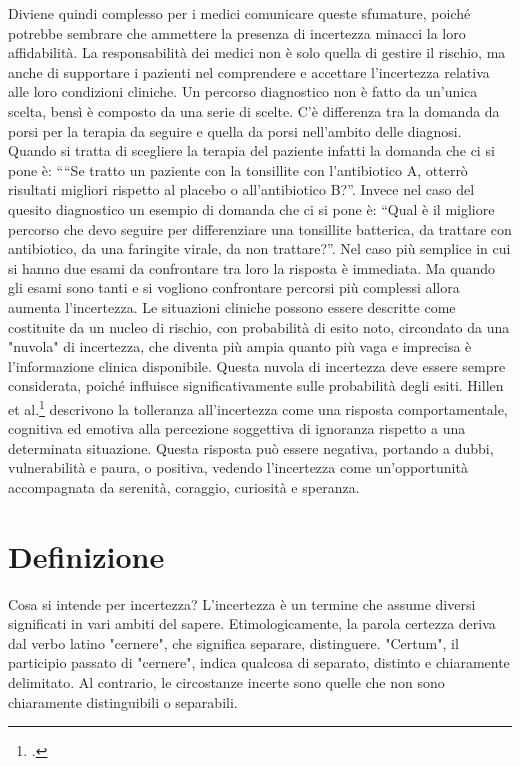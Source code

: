 Diviene quindi complesso per i medici comunicare queste sfumature, poiché potrebbe sembrare che ammettere la presenza di incertezza minacci la loro affidabilità. La responsabilità dei medici non è solo quella di gestire il rischio, ma anche di supportare i pazienti nel comprendere e accettare l'incertezza relativa alle loro condizioni cliniche. 
Un percorso diagnostico non è fatto da un'unica scelta, bensì è composto da una serie di scelte. C'è differenza tra la domanda da porsi per la terapia da seguire e quella da porsi nell'ambito delle diagnosi. Quando si tratta di scegliere la terapia del paziente infatti la domanda che ci si pone è: ““Se tratto un paziente con la tonsillite con l'antibiotico A, otterrò risultati migliori rispetto al placebo o all'antibiotico B?”. Invece nel caso del quesito diagnostico un esempio di domanda che ci si pone è:  “Qual è il migliore percorso che devo seguire per differenziare una tonsillite batterica, da trattare con antibiotico, da una faringite virale, da non trattare?”.
Nel caso più semplice in cui si hanno due esami da confrontare tra loro la risposta è immediata. Ma quando gli esami sono tanti e si vogliono confrontare percorsi più complessi allora aumenta l'incertezza. 
Le situazioni cliniche possono essere descritte come costituite da un nucleo di rischio, con probabilità di esito noto, circondato da una "nuvola" di incertezza, che diventa più ampia quanto più vaga e imprecisa è l'informazione clinica disponibile. Questa nuvola di incertezza deve essere sempre considerata, poiché influisce significativamente sulle probabilità degli esiti.
Hillen et al.\footcite{womak:tolleranza-incertezza} descrivono la tolleranza all'incertezza come una risposta comportamentale, cognitiva ed emotiva alla percezione soggettiva di ignoranza rispetto a una determinata situazione. Questa risposta può essere negativa, portando a dubbi, vulnerabilità e paura, o positiva, vedendo l'incertezza come un'opportunità accompagnata da serenità, coraggio, curiosità e speranza.


\section{Definizione}

Cosa si intende per incertezza? L'incertezza è un termine che assume diversi significati in vari ambiti del sapere. Etimologicamente, la parola certezza deriva dal verbo latino "cernere", che significa separare, distinguere. "Certum", il participio passato di "cernere", indica qualcosa di separato, distinto e chiaramente delimitato. Al contrario, le circostanze incerte sono quelle che non sono chiaramente distinguibili o separabili.\\

